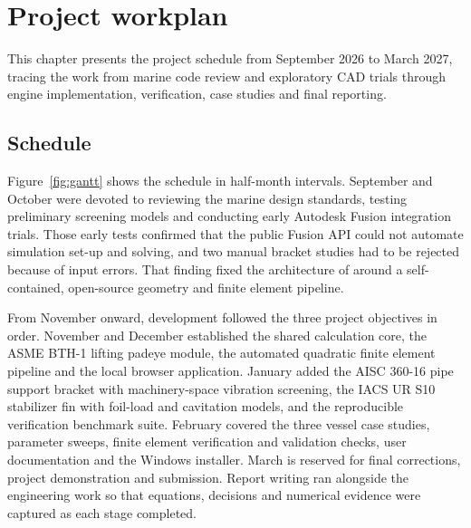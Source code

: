 \chapter{Project workplan}
\label{chap:workplan}

This chapter presents the project schedule from September 2026 to March 2027,
tracing the work from marine code review and exploratory CAD trials through
engine implementation, verification, case studies and final reporting.

\section{Schedule}
\label{sec:schedule}

Figure~\ref{fig:gantt} shows the schedule in half-month intervals. September
and October were devoted to reviewing the marine design standards, testing
preliminary screening models and conducting early Autodesk Fusion integration
trials. Those early tests confirmed that the public Fusion API could not
automate simulation set-up and solving, and two manual bracket studies had to
be rejected because of input errors. That finding fixed the architecture of
\NEMO{} around a self-contained, open-source geometry and finite element
pipeline.

From November onward, development followed the three project objectives in
order. November and December established the shared calculation core, the ASME
BTH-1 lifting padeye module, the automated quadratic finite element pipeline
and the local browser application. January added the AISC 360-16 pipe support
bracket with machinery-space vibration screening, the IACS UR S10 stabilizer
fin with foil-load and cavitation models, and the reproducible verification
benchmark suite. February covered the three vessel case studies, parameter
sweeps, finite element verification and validation checks, user documentation
and the Windows installer. March is reserved for final corrections, project
demonstration and submission. Report writing ran alongside the engineering
work so that equations, decisions and numerical evidence were captured as each
stage completed.

